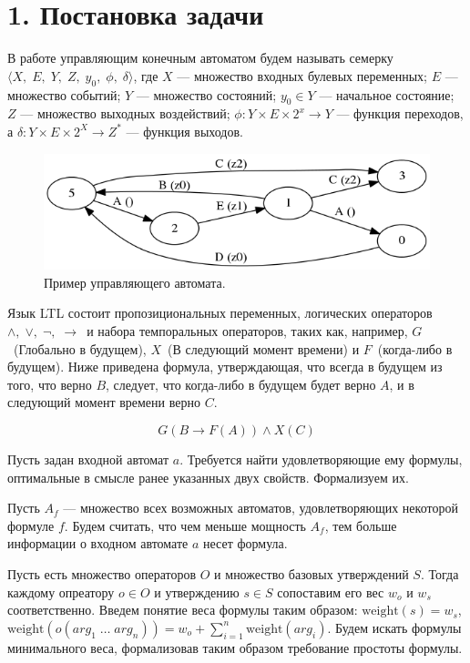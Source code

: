 \documentclass[12pt,fleqn]{article}
\begin{document}
\section{1. Постановка задачи}

В работе управляющим конечным автоматом будем называть семерку $\langle X,\; E,\; Y,\; Z,\; y_0,\; \phi,\; \delta \rangle$,
где $X$ --- множество входных булевых переменных; $E$ --- множество событий; $Y$ --- множество состояний;
$y_0 \in Y$ --- начальное состояние; $Z$ --- множество выходных воздействий;
$\phi : Y \times E \times 2^x \rightarrow Y$ --- функция переходов, а
$\delta : Y \times E \times 2^X \rightarrow Z^*$ --- функция выходов.

\begin{figure}[!hb]
  \centering
    \includegraphics[scale=0.5]{lift.png}
  \caption{Пример управляющего автомата.}
\end{figure}

Язык LTL состоит пропозициональных переменных, логических операторов $\wedge,\; \vee,\; \lnot,\; \rightarrow$\ и набора
темпоральных операторов, таких как, например, $G$\ (Глобально в будущем), $X$\ (В следующий момент времени) и
$F$\ (когда-либо в будущем). Ниже приведена формула, утверждающая, что всегда в будущем из того, что верно $B$, следует,
что когда-либо в будущем будет верно $A$, и в следующий момент времени верно $C$.

$$
G(B \rightarrow F(A)) \wedge X(C)
$$

Пусть задан входной автомат $a$. Требуется найти удовлетворяющие ему формулы, оптимальные в смысле ранее указанных
двух свойств. Формализуем их.

Пусть $A_f$ --- множество всех возможных автоматов, удовлетворяющих некоторой формуле $f$. Будем считать,
что чем меньше мощность $A_f$, тем больше информации о входном автомате $a$ несет формула.

Пусть есть множество операторов $O$ и множество базовых утверждений $S$.
Тогда каждому опреатору $o \in O$ и утверждению $s \in S$ сопоставим его вес $w_o$ и $w_s$ соответственно.
Введем понятие веса формулы таким образом: $\text{weight}(s) = w_s$, $\text{weight}(o(arg_1\; \ldots \; arg_n)) = w_o + \sum_{i=1}^{n}\text{weight}(arg_i)$.
Будем искать формулы минимального веса, формализовав таким образом требование простоты формулы.
\end{document}

